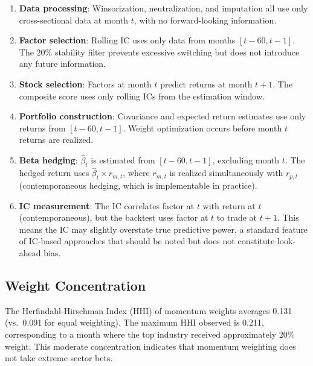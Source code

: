 \documentclass[12pt,a4paper]{article}
\begin{document}
\begin{enumerate}
    \item \textbf{Data processing}: Winsorization, neutralization, and imputation all use only cross-sectional data at month $t$, with no forward-looking information.

    \item \textbf{Factor selection}: Rolling IC uses only data from months $[t-60, t-1]$. The 20\% stability filter prevents excessive switching but does not introduce any future information.

    \item \textbf{Stock selection}: Factors at month $t$ predict returns at month $t+1$. The composite score uses only rolling ICs from the estimation window.

    \item \textbf{Portfolio construction}: Covariance and expected return estimates use only returns from $[t-60, t-1]$. Weight optimization occurs before month $t$ returns are realized.

    \item \textbf{Beta hedging}: $\hat{\beta}_t$ is estimated from $[t-60, t-1]$, excluding month $t$. The hedged return uses $\hat{\beta}_t \times r_{m,t}$, where $r_{m,t}$ is realized simultaneously with $r_{p,t}$ (contemporaneous hedging, which is implementable in practice).

    \item \textbf{IC measurement}: The IC correlates factor at $t$ with return at $t$ (contemporaneous), but the backtest uses factor at $t$ to trade at $t+1$. This means the IC may slightly overstate true predictive power, a standard feature of IC-based approaches that should be noted but does not constitute look-ahead bias.
\end{enumerate}

\subsection{Weight Concentration}

The Herfindahl-Hirschman Index (HHI) of momentum weights averages 0.131 (vs.\ 0.091 for equal weighting). The maximum HHI observed is 0.211, corresponding to a month where the top industry received approximately 20\% weight. This moderate concentration indicates that momentum weighting does not take extreme sector bets.


\end{document}
